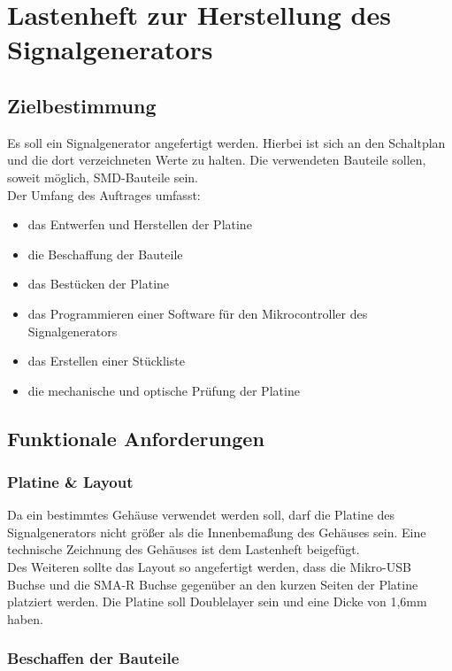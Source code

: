 \section{Lastenheft zur Herstellung des Signalgenerators}
\subsection{Zielbestimmung}
Es soll ein Signalgenerator angefertigt werden. Hierbei ist sich an den Schaltplan und die dort verzeichneten Werte zu halten.
Die verwendeten Bauteile sollen, soweit möglich, SMD-Bauteile sein.\\
Der Umfang des Auftrages umfasst:
\begin{itemize}
\item{das Entwerfen und Herstellen der Platine}
\item{die Beschaffung der Bauteile}
\item{das Bestücken der Platine}
\item{das Programmieren einer Software für den Mikrocontroller des Signalgenerators}
\item{das Erstellen einer Stückliste}
\item{die mechanische und optische Prüfung der Platine}
\end{itemize}

\subsection{Funktionale Anforderungen}

\subsubsection{Platine \& Layout}

Da ein bestimmtes Gehäuse verwendet werden soll, darf die Platine des Signalgenerators nicht größer als
die Innenbemaßung des Gehäuses sein. Eine technische Zeichnung des Gehäuses ist dem Lastenheft beigefügt.\\
Des Weiteren sollte das Layout so angefertigt werden, dass die Mikro-USB Buchse und die SMA-R Buchse gegenüber
an den kurzen Seiten der Platine platziert werden.
Die Platine soll Doublelayer sein und eine Dicke von 1,6mm haben.

\subsubsection{Beschaffen der Bauteile}

